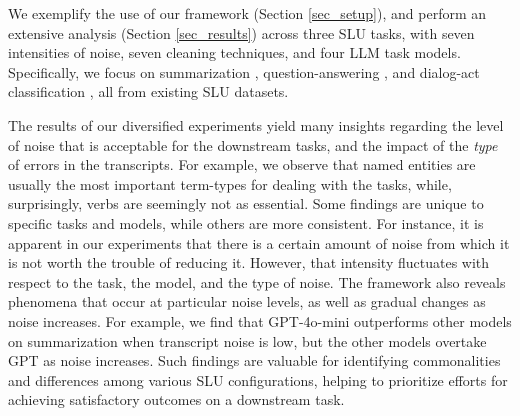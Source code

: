 We exemplify the use of our framework (Section \ref{sec_setup}), and perform an extensive analysis (Section \ref{sec_results}) across three SLU tasks, with seven intensities of noise, seven cleaning techniques, and four LLM task models. Specifically, we focus on %
summarization
\citep{zhong-etal-2021-qmsum}, %
question-answering
\citep{wu-etal-2022-qaconv}, and dialog-act classification
\citep{shriberg-etal-2004-icsi}, all from existing SLU datasets. 

The results of our diversified experiments yield many insights regarding the level of noise that is acceptable for the downstream tasks, and the impact of the \textit{type} of errors in the transcripts. For example, we observe that named entities are usually the most important term-types for dealing with the tasks, while, surprisingly, verbs are seemingly not as essential. Some findings are unique to specific tasks and models, while others are more consistent. For instance, it is apparent in our experiments that there is a certain amount of noise from which it is not worth the trouble of reducing it. However, that intensity fluctuates with respect to the task, the model, and the type of noise.
The framework also reveals phenomena that occur at particular noise levels, as well as gradual changes as noise increases. For example, we find that GPT-4o-mini \citep{openai2024gpt4ocard} outperforms other models on summarization when transcript noise is low, but the other models overtake GPT as noise increases.
Such findings are valuable for identifying commonalities and differences among various SLU configurations, helping to prioritize efforts for achieving satisfactory outcomes on a downstream task.








